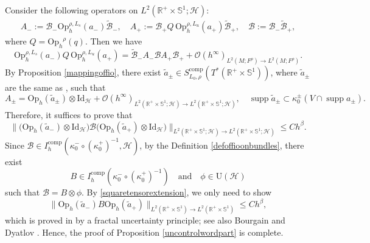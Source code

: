 \documentclass[11pt,oneside,reqno]{amsart}
\newcommand\Oph{\ensuremath{\mathrm{Op}_h}}
\theoremstyle{definition}
\numberwithin{equation}{section}
\theoremstyle{plain}
\begin{document}
Consider the following operators on $L^2(\mathbb{R}^{+} \times \mathbb{S}^1;\mathcal{H})$:
\begin{equation}
\begin{aligned}
A_{-}:=\mathcal{B}_{-} \mathrm{Op}_h^{\rho, L_s}(a_-)\widetilde{\mathcal{B}}_{-}, \quad A_{+}:=\mathcal{B}_{+}Q\,\mathrm{Op}_h^{\rho, L_u}(a_+)\widetilde{\mathcal{B}}_{+}, \quad \mathcal{B} :=\mathcal{B}_{-}\widetilde{\mathcal{B}}_{+},
\end{aligned}
\end{equation}
where $Q=\Oph^{\rho}(q)$. Then we have
\begin{equation*}
    \mathrm{Op}_h^{\rho,L_s}(a_-) Q \,\mathrm{Op}_h^{\rho, L_u}(a_+)=\widetilde{\mathcal{B}}_{-} A_{-} \mathcal{B} A_{+} \mathcal{B}_{+}+\mathcal{O}(h^{\infty})_{L^2(M;F^{\rho})\rightarrow L^2(M;F^{\rho})}.
\end{equation*}
By Proposition \ref{mappingoffio}, there exist $\widetilde{a}_{ \pm} \in S_{L_0, \rho}^{\mathrm{comp}}\left(T^*(\mathbb{R}^{+} \times \mathbb{S}^1)\right)$, where $\widetilde{a}_{ \pm}$ are the same as \cite[(5.11)]{dyatlov2018semiclassical}, such that
\begin{equation*}
    A_{ \pm}=\mathrm{Op}_h(\widetilde{a}_{ \pm})\otimes \mathrm{Id}_{\mathcal{H}}+\mathcal{O}(h^{\infty})_{L^2(\mathbb{R}^{+} \times \mathbb{S}^1;\mathcal{H})\to L^2(\mathbb{R}^{+} \times \mathbb{S}^1;\mathcal{H})}, \quad \operatorname{supp} \widetilde{a}_{ \pm} \subset \kappa_0^{ \pm}(V \cap \operatorname{supp} a_{ \pm}).
\end{equation*}
Therefore, it suffices to prove that
\begin{equation*}
    \big\|\big(\mathrm{Op}_h(\widetilde{a}_{-})\otimes \mathrm{Id}_{\mathcal{H}} \big) \mathcal{B} \big(\mathrm{Op}_h(\widetilde{a}_{+})\otimes \mathrm{Id}_{\mathcal{H}}\big)\big\|_{L^2(\mathbb{R}^{+} \times \mathbb{S}^1;\mathcal{H}) \rightarrow L^2(\mathbb{R}^{+} \times \mathbb{S}^1;\mathcal{H})} \leq C h^\beta.
\end{equation*}
Since $\mathcal{B}\in  I^{\mathrm{comp}}_h\left(\kappa^{-}_{0} \circ(\kappa^{+}_{0})^{-1},\mathcal{H}\right)$, by the Definition \ref{defoffioonbundles}, there exist
\begin{equation*}
    B\in I^{\mathrm{comp}}_h\left(\kappa^{-}_{0} \circ(\kappa^{+}_{0})^{-1} \right) \quad \text{and} \quad \phi \in \mathrm{U}(\mathcal{H})
\end{equation*}
such that $\mathcal{B}=B\otimes \phi$. By \eqref{squaretensorextension}, we only need to show 
\begin{equation*}
    \|\mathrm{Op}_h(\widetilde{a}_{-}) B\mathrm{Op}_h(\widetilde{a}_{+})\|_{L^2(\mathbb{R}^{+} \times \mathbb{S}^1) \rightarrow L^2(\mathbb{R}^{+} \times \mathbb{S}^1)} \leq C h^\beta,
\end{equation*}
which is proved in \cite[(5.12)]{dyatlov2018semiclassical} by a fractal uncertainty principle; see also Bourgain and Dyatlov \cite{2018bourgaindyatlov}. Hence, the proof of Proposition \ref{uncontrolwordpart} is complete.
\end{document}
